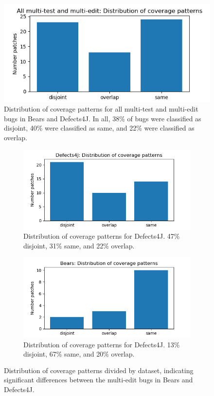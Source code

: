 \begin{figure}
	\includegraphics[width=\linewidth]{img/coverage-all.png}
	\caption{Distribution of coverage patterns for all multi-test and 
	multi-edit bugs in Bears and Defects4J. In all, 38\% of bugs were classified as disjoint, 40\% were 
	classified as same, and 22\% were classified as overlap.}
	\label{fig:coverage-all}
\end{figure}


\begin{figure}
	\begin{subfigure}{\linewidth}
		\includegraphics[width=\linewidth]{img/coverage-d4j.png}
		\caption{Distribution of coverage patterns for Defects4J. 47\% disjoint, 31\% same, and 22\% 
		overlap.}
	\end{subfigure}
	\begin{subfigure}{\linewidth}
		\includegraphics[width=\linewidth]{img/coverage-bears.png}
		\caption{Distribution of coverage patterns for Defects4J. 13\% disjoint, 67\% same, and 20\% 
		overlap.}
	\end{subfigure}
	\caption{Distribution of coverage patterns divided by dataset,
          indicating significant differences between the multi-edit bugs in
          Bears and Defects4J.}
	\label{fig:coverage-datasets}
\end{figure}

